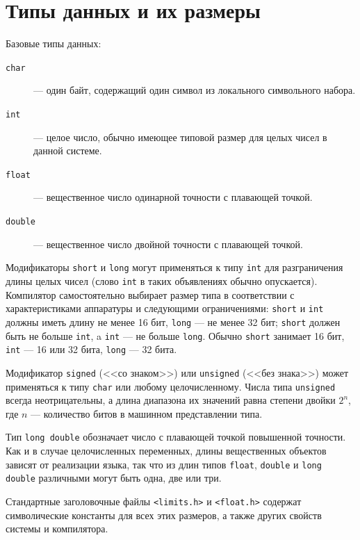 \section{Типы данных и их размеры}

Базовые типы данных:
\begin{description}
\item[\texttt{char}] --- один байт, содержащий один символ из локального символьного набора.
\item[\texttt{int}] --- целое число, обычно имеющее типовой размер для целых чисел в данной системе.
\item[\texttt{float}] --- вещественное число одинарной точности с плавающей точкой.
\item[\texttt{double}] --- вещественное число двойной точности с плавающей точкой.
\end{description}

Модификаторы \texttt{short} и \texttt{long} могут применяться к типу \texttt{int}
для разграничения длины целых чисел (слово \texttt{int} в таких объявлениях обычно опускается).
Компилятор самостоятельно выбирает размер типа в соответствии с характеристиками аппаратуры
и следующими ограничениями: \texttt{short} и \texttt{int} должны иметь длину не менее 16 бит,
\texttt{long} --- не менее 32 бит; \texttt{short} должен быть не больше \texttt{int},
a \texttt{int} --- не больше \texttt{long}.
Обычно \texttt{short} занимает 16 бит, \texttt{int} --- 16 или 32 бита, \texttt{long} --- 32 бита. 

Модификатор \texttt{signed} (<<со знаком>>) или \texttt{unsigned} (<<без знака>>) может 
применяться к типу \texttt{char} или любому целочисленному.
Числа типа \texttt{unsigned} всегда неотрицательны, а длина диапазона их значений
равна степени двойки $2^n$, где $n$ --- количество битов в машинном представлении типа.

Тип \texttt{long double} обозначает число с плавающей точкой повышенной точности.
Как и в случае целочисленных переменных, длины вещественных объектов
зависят от реализации языка, так что из длин типов \texttt{float}, \texttt{double}
и \texttt{long double} различными могут быть одна, две или три.

Стандартные заголовочные файлы \texttt{<limits.h>} и \texttt{<float.h>}
содержат символические константы для всех этих размеров, а также других свойств
системы и компилятора.

